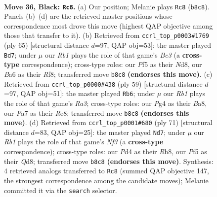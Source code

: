 \documentclass[11pt]{article}
\begin{document}
\clearpage

\begin{figure}[p]\centering
\begin{subfigure}{0.46\textwidth}\centering
\resizebox{\linewidth}{!}{%
\newchessgame
\chessboard[
  setfen={nr4k1/p2qbrn1/b7/P1p2p1p/3p1Pp1/1P4P1/Q1R1P1BP/R1BNN1K1 b - - 5 36},
  showmover=false,
  pgfstyle=straightmove, color=movearrow, markmove={b8-c8}
]}
\caption{}
\end{subfigure}\hfill
\begin{subfigure}{0.46\textwidth}\centering
\resizebox{\linewidth}{!}{%
\newchessgame
\chessboard[
  setfen={3n1r2/2q3nk/1pb1p1rp/p2p2p1/P1pP2B1/2P1R2P/2P1QPPN/R1B3K1 b - - 3 33},
  showmover=false,
  pgfstyle=straightmove, color=movearrow, markmove={c6-d7}
]}
\caption{}
\end{subfigure}
\\[4pt]
\begin{subfigure}{0.46\textwidth}\centering
\resizebox{\linewidth}{!}{%
\newchessgame
\chessboard[
  setfen={b3r1k1/p1q4p/r5p1/2p1np2/2P1pN1P/2R3P1/P2RPPB1/2Q3K1 b - - 7 30},
  showmover=false,
  pgfstyle=straightmove, color=movearrow, markmove={a6-b6}
]}
\caption{}
\end{subfigure}\hfill
\begin{subfigure}{0.46\textwidth}\centering
\resizebox{\linewidth}{!}{%
\newchessgame
\chessboard[
  setfen={1r1q4/4p1bk/1p2bnp1/r1p1p2p/P3P3/2N1BPPP/1R5K/1RQ2B2 b - - 0 36},
  showmover=false,
  pgfstyle=straightmove, color=movearrow, markmove={f6-d7}
]}
\caption{}
\end{subfigure}
\caption{\textbf{Move 36, Black: \texttt{Rc8}.} (a) Our position; Melanie plays \texttt{Rc8} (\texttt{b8c8}). Panels (b)--(d) are the retrieved master positions whose correspondence most drove this move (highest QAP objective among those that transfer to it). (b) Retrieved from \texttt{ccrl\_top\_p0003\#1769} (ply 65) [structural distance $d$=97, QAP obj=53]: the master played \texttt{Bd7}; under $\mu$ our \emph{Rb1} plays the role of that game's \emph{Bc3} (a \textbf{cross-type} correspondence); cross-type roles: our \emph{P}f5 as their \emph{N}d8, our \emph{B}a6 as their \emph{R}f8; transferred move \texttt{b8c8} \textbf{(endorses this move)}. (c) Retrieved from \texttt{ccrl\_top\_p0000\#438} (ply 59) [structural distance $d$=97, QAP obj=51]: the master played \texttt{Rb6}; under $\mu$ our \emph{Rb1} plays the role of that game's \emph{Ra3}; cross-type roles: our \emph{P}g4 as their \emph{B}a8, our \emph{P}a7 as their \emph{R}e8; transferred move \texttt{b8c8} \textbf{(endorses this move)}. (d) Retrieved from \texttt{ccrl\_top\_p0001\#680} (ply 71) [structural distance $d$=83, QAP obj=25]: the master played \texttt{Nd7}; under $\mu$ our \emph{Rb1} plays the role of that game's \emph{Nf3} (a \textbf{cross-type} correspondence); cross-type roles: our \emph{P}d4 as their \emph{R}b8, our \emph{P}f5 as their \emph{Q}d8; transferred move \texttt{b8c8} \textbf{(endorses this move)}. Synthesis: 4 retrieved analogs transferred to \texttt{Rc8} (summed QAP objective 147, the strongest correspondence among the candidate moves); Melanie committed it via the \texttt{search} selector.}
\label{fig:thought-m71}
\end{figure}
\end{document}
